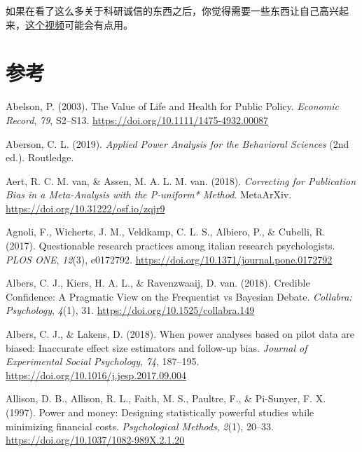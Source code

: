 \documentclass[
  letterpaper,
  DIV=11,
  numbers=noendperiod]{scrreprt}
\newlength{\cslhangindent}
\newlength{\cslentryspacingunit} %
\newenvironment{CSLReferences}[2] %
 {%
  \setlength{\parindent}{0pt}
  \ifodd #1
  \let\oldpar\par
  \def\par{\hangindent=\cslhangindent\oldpar}
  \fi
  \setlength{\parskip}{#2\cslentryspacingunit}
 }%
 {}
\begin{document}
如果在看了这么多关于科研诚信的东西之后，你觉得需要一些东西让自己高兴起来，\href{https://youtu.be/ZaNtz76dNSI}{这个视频}可能会有点用。


\hypertarget{ux53c2ux8003}{%
\chapter*{参考}\label{ux53c2ux8003}}


\hypertarget{refs}{}
\begin{CSLReferences}{1}{0}
\leavevmode{}%
Abelson, P. (2003). The {Value} of {Life} and {Health} for {Public
Policy}. \emph{Economic Record}, \emph{79}, S2--S13.
\url{https://doi.org/10.1111/1475-4932.00087}

\leavevmode{}%
Aberson, C. L. (2019). \emph{Applied {Power Analysis} for the
{Behavioral Sciences}} (2nd ed.). {Routledge}.

\leavevmode{}%
Aert, R. C. M. van, \& Assen, M. A. L. M. van. (2018). \emph{Correcting
for {Publication Bias} in a {Meta-Analysis} with the {P-uniform}*
{Method}}. {MetaArXiv}. \url{https://doi.org/10.31222/osf.io/zqjr9}

\leavevmode{}%
Agnoli, F., Wicherts, J. M., Veldkamp, C. L. S., Albiero, P., \&
Cubelli, R. (2017). Questionable research practices among italian
research psychologists. \emph{PLOS ONE}, \emph{12}(3), e0172792.
\url{https://doi.org/10.1371/journal.pone.0172792}

\leavevmode{}%
Albers, C. J., Kiers, H. A. L., \& Ravenzwaaij, D. van. (2018). Credible
{Confidence}: {A Pragmatic View} on the {Frequentist} vs {Bayesian
Debate}. \emph{Collabra: Psychology}, \emph{4}(1), 31.
\url{https://doi.org/10.1525/collabra.149}

\leavevmode{}%
Albers, C. J., \& Lakens, D. (2018). When power analyses based on pilot
data are biased: {Inaccurate} effect size estimators and follow-up bias.
\emph{Journal of Experimental Social Psychology}, \emph{74}, 187--195.
\url{https://doi.org/10.1016/j.jesp.2017.09.004}

\leavevmode{}%
Allison, D. B., Allison, R. L., Faith, M. S., Paultre, F., \& Pi-Sunyer,
F. X. (1997). Power and money: {Designing} statistically powerful
studies while minimizing financial costs. \emph{Psychological Methods},
\emph{2}(1), 20--33. \url{https://doi.org/10.1037/1082-989X.2.1.20}


\end{CSLReferences}
\end{document}
